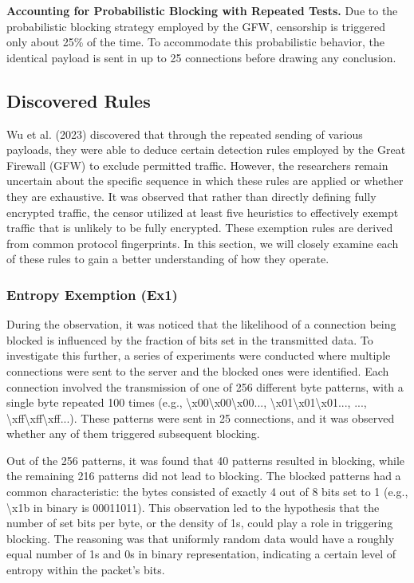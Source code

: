 \textbf{Accounting for Probabilistic Blocking with Repeated Tests.} Due to the probabilistic blocking strategy employed by the GFW, censorship is triggered only about 25\% of the time. To accommodate this probabilistic behavior, the identical payload is sent in up to 25 connections before drawing any conclusion.


\subsection{Discovered Rules}
Wu et al. (2023) discovered that through the repeated sending of various payloads, they were able to deduce certain detection rules employed by the Great Firewall (GFW) to exclude permitted traffic. However, the researchers remain uncertain about the specific sequence in which these rules are applied or whether they are exhaustive. It was observed that rather than directly defining fully encrypted traffic, the censor utilized at least five heuristics to effectively exempt traffic that is unlikely to be fully encrypted. These exemption rules are derived from common protocol fingerprints. In this section, we will closely examine each of these rules to gain a better understanding of how they operate.

\subsubsection{Entropy Exemption (Ex1)}
During the observation, it was noticed that the likelihood of a connection being blocked is influenced by the fraction of bits set in the transmitted data. To investigate this further, a series of experiments were conducted where multiple connections were sent to the server and the blocked ones were identified. Each connection involved the transmission of one of 256 different byte patterns, with a single byte repeated 100 times (e.g., \textbackslash x00\textbackslash x00\textbackslash x00..., \textbackslash x01\textbackslash x01\textbackslash x01..., ..., \textbackslash xff\textbackslash xff\textbackslash xff...). These patterns were sent in 25 connections, and it was observed whether any of them triggered subsequent blocking.

Out of the 256 patterns, it was found that 40 patterns resulted in blocking, while the remaining 216 patterns did not lead to blocking. The blocked patterns had a common characteristic: the bytes consisted of exactly 4 out of 8 bits set to 1 (e.g., \textbackslash x1b in binary is 00011011). This observation led to the hypothesis that the number of set bits per byte, or the density of 1s, could play a role in triggering blocking. The reasoning was that uniformly random data would have a roughly equal number of 1s and 0s in binary representation, indicating a certain level of entropy within the packet's bits.

